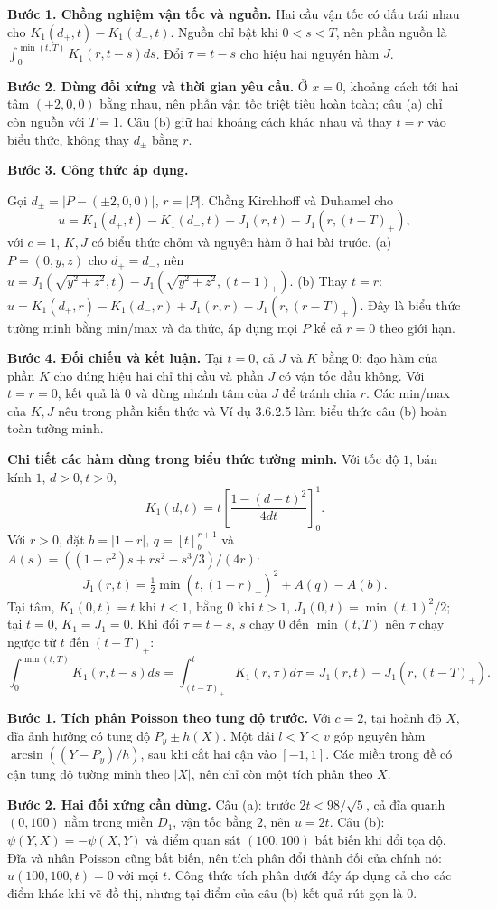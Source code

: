 \textbf{Bước 1. Chồng nghiệm vận tốc và nguồn.} Hai cầu vận tốc có dấu trái nhau cho $K_1(d_+,t)-K_1(d_-,t)$. Nguồn chỉ bật khi $0<s<T$, nên phần nguồn là $\int_0^{\min(t,T)}K_1(r,t-s)ds$. Đổi $\tau=t-s$ cho hiệu hai nguyên hàm $J$.

\textbf{Bước 2. Dùng đối xứng và thời gian yêu cầu.} Ở $x=0$, khoảng cách tới hai tâm $(\pm2,0,0)$ bằng nhau, nên phần vận tốc triệt tiêu hoàn toàn; câu (a) chỉ còn nguồn với $T=1$. Câu (b) giữ hai khoảng cách khác nhau và thay $t=r$ vào biểu thức, không thay $d_\pm$ bằng $r$.

\textbf{Bước 3. Công thức áp dụng.}

Gọi $d_\pm=|P-(\pm2,0,0)|$, $r=|P|$. Chồng Kirchhoff và Duhamel cho
\[u=K_1(d_+,t)-K_1(d_-,t)+J_1(r,t)-J_1(r,(t-T)_+),\]
với $c=1$, $K,J$ có biểu thức chỏm và nguyên hàm ở hai bài trước.
(a) $P=(0,y,z)$ cho $d_+=d_-$, nên $u=J_1(\sqrt{y^2+z^2},t)-J_1(\sqrt{y^2+z^2},(t-1)_+)$.
(b) Thay $t=r$: $u=K_1(d_+,r)-K_1(d_-,r)+J_1(r,r)-J_1(r,(r-T)_+)$. Đây là biểu thức tường minh bằng min/max và đa thức, áp dụng mọi $P$ kể cả $r=0$ theo giới hạn.

\textbf{Bước 4. Đối chiếu và kết luận.} Tại $t=0$, cả $J$ và $K$ bằng $0$; đạo hàm của phần $K$ cho đúng hiệu hai chỉ thị cầu và phần $J$ có vận tốc đầu không. Với $t=r=0$, kết quả là $0$ và dùng nhánh tâm của $J$ để tránh chia $r$. Các min/max của $K,J$ nêu trong phần kiến thức và Ví dụ 3.6.2.5 làm biểu thức câu (b) hoàn toàn tường minh.

\textbf{Chi tiết các hàm dùng trong biểu thức tường minh.} Với tốc độ $1$, bán kính $1$, $d>0,t>0$,
\[K_1(d,t)=t\left[\frac{1-(d-t)^2}{4dt}\right]_0^1.\]
Với $r>0$, đặt $b=|1-r|$, $q=[t]_b^{r+1}$ và $A(s)=((1-r^2)s+rs^2-s^3/3)/(4r)$:
\[J_1(r,t)=\tfrac12\min(t,(1-r)_+)^2+A(q)-A(b).\]
Tại tâm, $K_1(0,t)=t$ khi $t<1$, bằng $0$ khi $t>1$, $J_1(0,t)=\min(t,1)^2/2$; tại $t=0$, $K_1=J_1=0$. Khi đổi $\tau=t-s$, $s$ chạy $0$ đến $\min(t,T)$ nên $\tau$ chạy ngược từ $t$ đến $(t-T)_+$:
\[\int_0^{\min(t,T)}K_1(r,t-s)ds=\int_{(t-T)_+}^{t}K_1(r,\tau)d\tau=J_1(r,t)-J_1(r,(t-T)_+).\]

\textbf{Bước 1. Tích phân Poisson theo tung độ trước.} Với $c=2$, tại hoành độ $X$, đĩa ảnh hưởng có tung độ $P_y\pm h(X)$. Một dải $l<Y<v$ góp nguyên hàm $\arcsin((Y-P_y)/h)$, sau khi cắt hai cận vào $[-1,1]$. Các miền trong đề có cận tung độ tường minh theo $|X|$, nên chỉ còn một tích phân theo $X$.

\textbf{Bước 2. Hai đối xứng cần dùng.} Câu (a): trước $2t<98/\sqrt5$, cả đĩa quanh $(0,100)$ nằm trong miền $D_1$, vận tốc bằng $2$, nên $u=2t$. Câu (b): $\psi(Y,X)=-\psi(X,Y)$ và điểm quan sát $(100,100)$ bất biến khi đổi tọa độ. Đĩa và nhân Poisson cũng bất biến, nên tích phân đổi thành đối của chính nó: $u(100,100,t)=0$ với mọi $t$. Công thức tích phân dưới đây áp dụng cả cho các điểm khác khi vẽ đồ thị, nhưng tại điểm của câu (b) kết quả rút gọn là $0$.

